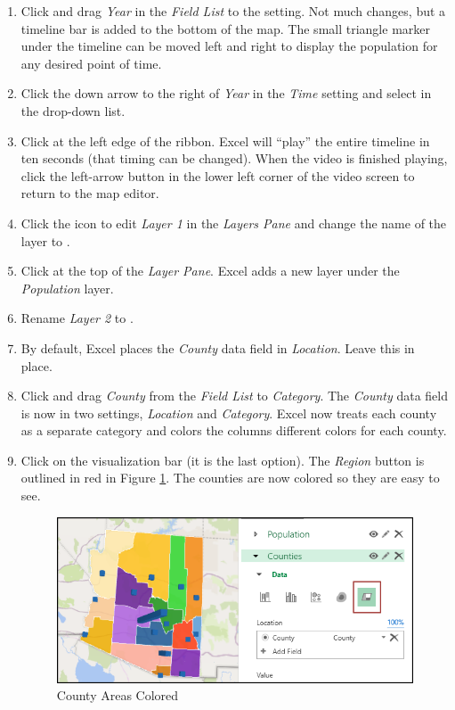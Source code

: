 \begin{enumbox}
\begin{enumerate}
		\item Click and drag \textit{Year} in the \textit{Field List} to the  setting. Not much changes, but a timeline bar is added to the bottom of the map. The small triangle marker under the timeline can be moved left and right to display the population for any desired point of time.
		\item Click the down arrow to the right of \textit{Year} in the \textit{Time} setting and select  in the drop-down list.
		\item Click  at the left edge of the ribbon. Excel will ``play'' the entire timeline in ten seconds (that timing can be changed). When the video is finished playing, click the left-arrow button in the lower left corner of the video screen to return to the map editor.
		\item Click the  icon to edit \textit{Layer 1} in the \textit{Layers Pane} and change the name of the layer to .
	
		\item Click  at the top of the \textit{Layer Pane}. Excel adds a new layer under the \textit{Population} layer.
		\item Rename \textit{Layer 2} to .
		\item By default, Excel places the \textit{County} data field in \textit{Location}. Leave this in place.
		\item Click and drag \textit{County} from the \textit{Field List} to \textit{Category}. The \textit{County} data field is now in two settings, \textit{Location} and \textit{Category}. Excel now treats each county as a separate category and colors the columns different colors for each county.
		\item Click  on the visualization bar (it is the last option). The \textit{Region} button is outlined in red in Figure \ref{08:fig28}. The counties are now colored so they are easy to see. 

		\begin{figure}[H]
			\centering
			\includegraphics[width=\maxwidth{.85\linewidth}]{gfx/ch08_fig28}
			\caption{County Areas Colored}
			\label{08:fig28}
		\end{figure}


\end{enumerate}
\end{enumbox}
